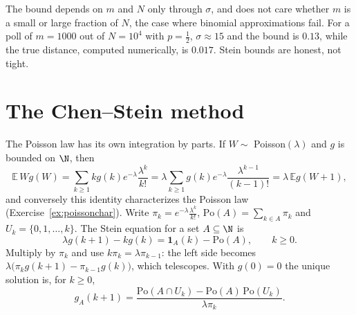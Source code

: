 The bound depends on $m$ and $N$ only through $\sigma$, and does not care whether $m$ is a small or large fraction of $N$, the case where binomial
approximations fail. For a poll of $m=1000$ out of $N=10^4$ with $p=\frac12$, $\sigma\approx15$ and the bound is $0.13$, while the true distance, computed numerically, is $0.017$. Stein bounds are honest, not tight.

\section{The Chen--Stein method}

The Poisson law has its own integration by parts. If $W\sim$ Poisson$(\lambda)$ and $g$ is bounded on $\N$, then
\[
\mathbb E\,Wg(W)=\sum_{k\ge1}kg(k)e^{-\lambda}\frac{\lambda^k}{k!}=\lambda\sum_{k\ge1}g(k)e^{-\lambda}\frac{\lambda^{k-1}}{(k-1)!}=\lambda\,\mathbb Eg(W+1),
\]
and conversely this identity characterizes the Poisson law (Exercise~\ref{ex:poissonchar}). Write $\pi_k=e^{-\lambda}\frac{\lambda^k}{k!}$, $\mathrm{Po}(A)=\sum_{k\in A}\pi_k$ and
$U_k=\{0,1,\dots,k\}$. The Stein equation for a set $A\subseteq\N$ is
\begin{equation}\label{eq:chensteineq}
\lambda g(k+1)-kg(k)=\mathbf 1_A(k)-\mathrm{Po}(A),\qquad k\ge0.
\end{equation}
Multiply by $\pi_k$ and use $k\pi_k=\lambda\pi_{k-1}$: the left side becomes $\lambda\bigl(\pi_kg(k+1)-\pi_{k-1}g(k)\bigr)$, which telescopes. With $g(0)=0$ the
unique solution is, for $k\ge0$,
\begin{equation}\label{eq:chensteinsol}
g_A(k+1)=\frac{\mathrm{Po}(A\cap U_k)-\mathrm{Po}(A)\,\mathrm{Po}(U_k)}{\lambda\pi_k}.
\end{equation}

